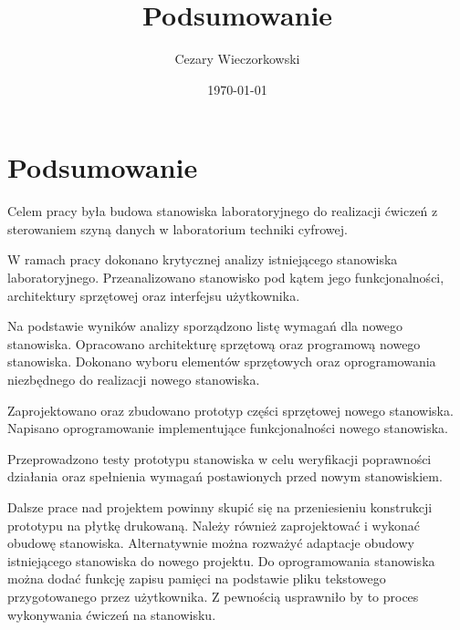 \documentclass[../main.tex]{subfiles}
\author{Cezary Wieczorkowski}
\date{\today}
\title{Podsumowanie}
\begin{document}
\section{Podsumowanie}

Celem pracy była budowa stanowiska laboratoryjnego do realizacji ćwiczeń z sterowaniem szyną danych w laboratorium techniki cyfrowej.
\par
W ramach pracy dokonano krytycznej analizy istniejącego stanowiska laboratoryjnego. Przeanalizowano stanowisko pod kątem jego funkcjonalności,
architektury sprzętowej oraz interfejsu użytkownika.
\par
Na podstawie wyników analizy sporządzono listę wymagań dla nowego stanowiska. Opracowano architekturę sprzętową oraz programową nowego stanowiska.
Dokonano wyboru elementów sprzętowych oraz oprogramowania niezbędnego do realizacji nowego stanowiska.
\par
Zaprojektowano oraz zbudowano prototyp części sprzętowej nowego stanowiska. Napisano oprogramowanie implementujące funkcjonalności nowego stanowiska.
\par
Przeprowadzono testy prototypu stanowiska w celu weryfikacji poprawności działania oraz spełnienia wymagań postawionych przed nowym stanowiskiem.
\par
Dalsze prace nad projektem powinny skupić się na przeniesieniu konstrukcji prototypu na płytkę drukowaną. Należy również zaprojektować i wykonać 
obudowę stanowiska. Alternatywnie można rozważyć adaptacje obudowy istniejącego stanowiska do nowego projektu. Do oprogramowania stanowiska 
można dodać funkcję zapisu pamięci na podstawie pliku tekstowego przygotowanego przez użytkownika. Z pewnością usprawniło by to proces
wykonywania ćwiczeń na stanowisku.
\end{document}
